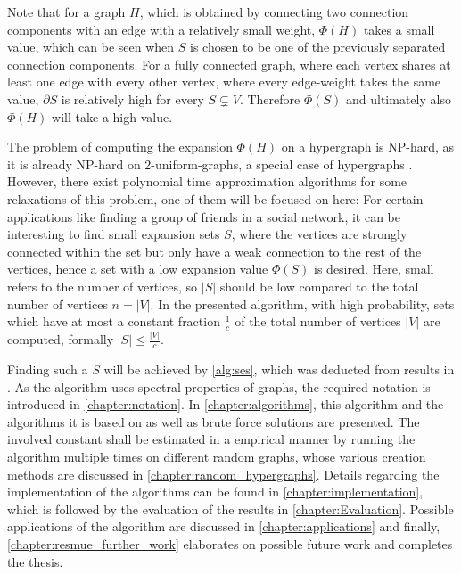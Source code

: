 Note that for a graph $H$, which is obtained by connecting two connection components with an edge with a relatively small weight, $\Phi(H)$ takes a small value, which can be seen when $S$ is chosen to be one of the previously separated connection components. For a fully connected graph, where each vertex shares at least one edge with every other vertex, where every edge-weight takes the same value,  $\partial S$ is relatively high for every $S\subsetneq V$. Therefore $\Phi(S)$ and ultimately also $\Phi(H)$ will take a high value.

The problem of computing the expansion $\Phi(H)$ on a hypergraph is NP-hard, as it is already NP-hard on 2-uniform-graphs, a special case of hypergraphs \cite{kaibel2004expansion}.
However, there exist polynomial time approximation algorithms for some relaxations of this problem, one of them will be focused on here:
For certain applications like finding a group of friends in a social network, it can be interesting to find small expansion sets $S$, where the vertices are strongly connected within the set but only have a weak connection to the rest of the vertices, hence a set with a low expansion value $\Phi(S)$ is desired. Here, small refers to the number of vertices, so $|S|$ should be low compared to the total number of vertices $n = |V|$. In the presented algorithm, with high probability, sets which have at most a constant fraction $\frac{1}{c}$ of the total number of vertices $|V|$ are computed, formally $|S|\le \frac{|V|}{c}$.

Finding such a $S$ will be achieved by \cref{alg:ses}, which was deducted from results in \cite{ChanLTZ16}. As the algorithm uses spectral properties of graphs, the required notation is introduced in \cref{chapter:notation}. In \cref{chapter:algorithms}, this algorithm and the algorithms it is based on as well as brute force solutions are presented.
The involved constant shall be estimated in a empirical manner by running the algorithm multiple times on different random graphs, whose various creation methods are discussed in \cref{chapter:random_hypergraphs}.  Details regarding the implementation of the algorithms can be found in \cref{chapter:implementation}, which is followed by the evaluation of the results in \cref{chapter:Evaluation}. Possible applications of the algorithm are discussed in \cref{chapter:applications} and finally, \cref{chapter:resmue_further_work} elaborates on possible future work and completes the thesis.








